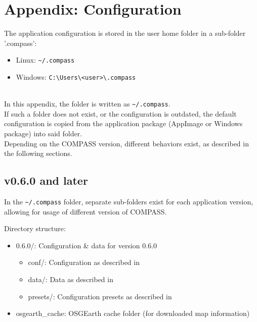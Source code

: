\section{Appendix: Configuration}
\label{sec:appendix_configuration}

The application configuration is stored in the user home folder in a sub-folder '.compass':

\begin{itemize}
\item Linux: \texttt{\textasciitilde/.compass}
\item Windows: \texttt{C:\textbackslash Users\textbackslash <user>\textbackslash .compass}
\end{itemize}
\ \\

In this appendix, the folder is written as \texttt{\textasciitilde/.compass}. \\

If such a folder does not exist, or the configuration is outdated, the default configuration is copied from the application package (AppImage or Windows package) into said folder. \\

Depending on the COMPASS version, different behaviors exist, as described in the following sections.

\subsection{v0.6.0 and later}

In the \texttt{\textasciitilde/.compass} folder, separate sub-folders exist for each application version, allowing for usage of different version of COMPASS.

Directory structure:
\begin{itemize}
\item 0.6.0/: Configuration \& data for version 0.6.0
\begin{itemize}
\item conf/: Configuration as described in 
\item data/: Data as described in 
\item presets/: Configuration presets as described in 
\end{itemize}
\item osgearth\_cache: OSGEarth cache folder (for downloaded map information)
\end{itemize}

